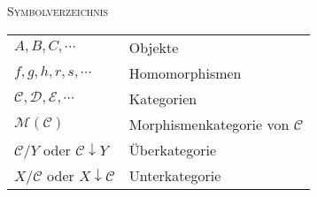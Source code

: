 \documentclass[a4paper]{amsart}
\theoremstyle{definition}
\begin{document}
\begin{large}
    \centerline{\textsc{Symbolverzeichnis}}
\end{large}
\bigskip

\renewcommand*{\arraystretch}{1}

\begin{tabular}{ll}
    $A, B, C, \cdots$          & Objekte\\
    $f, g, h, r, s, \cdots$   & Homomorphismen\\
    $\mathcal C, \mathcal D, \mathcal E, \cdots$ & Kategorien\\
    $\mathcal M ( \mathcal C)$ & Morphismenkategorie von $\mathcal C$\\
    $\mathcal C / Y$ oder  $\mathcal C \downarrow Y$ & Überkategorie\\
    $X / \mathcal C$ oder  $X \downarrow \mathcal C$ & Unterkategorie
\end{tabular}
\end{document}
